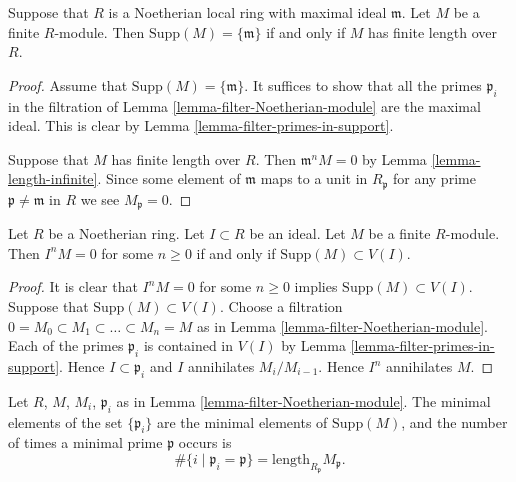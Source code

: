 \begin{lemma}
\label{lemma-support-point}
Suppose that $R$ is a Noetherian local ring with
maximal ideal $\mathfrak m$. Let $M$ be a finite
$R$-module. Then $\text{Supp}(M) = \{ \mathfrak m\}$
if and only if $M$ has finite length over $R$.
\end{lemma}

\begin{proof}
Assume that $\text{Supp}(M) = \{ \mathfrak m\}$.
It suffices to show that all the primes $\mathfrak p_i$
in the filtration of Lemma \ref{lemma-filter-Noetherian-module}
are the maximal ideal. This is clear by
Lemma \ref{lemma-filter-primes-in-support}.

\medskip\noindent
Suppose that $M$ has finite length over $R$.
Then $\mathfrak m^n M = 0$ by Lemma \ref{lemma-length-infinite}.
Since some element of $\mathfrak m$ maps to a unit
in $R_{\mathfrak p}$ for any prime
$\mathfrak p \not = \mathfrak m$ in $R$ we see $M_{\mathfrak p} = 0$.
\end{proof}

\begin{lemma}
\label{lemma-Noetherian-power-ideal-kills-module}
Let $R$ be a Noetherian ring.
Let $I \subset R$ be an ideal.
Let $M$ be a finite $R$-module.
Then $I^nM = 0$ for some $n \geq 0$ if and only if
$\text{Supp}(M) \subset V(I)$.
\end{lemma}

\begin{proof}
It is clear that $I^nM = 0$ for some $n \geq 0$ implies
$\text{Supp}(M) \subset V(I)$. Suppose that $\text{Supp}(M) \subset V(I)$.
Choose a filtration $0 = M_0 \subset M_1 \subset \ldots \subset M_n = M$
as in Lemma \ref{lemma-filter-Noetherian-module}. Each of the primes
$\mathfrak p_i$ is contained in $V(I)$ by
Lemma \ref{lemma-filter-primes-in-support}.
Hence $I \subset \mathfrak p_i$ and $I$ annihilates $M_i/M_{i - 1}$.
Hence $I^n$ annihilates $M$.
\end{proof}

\begin{lemma}
\label{lemma-filter-minimal-primes-in-support}
Let $R$, $M$, $M_i$, $\mathfrak p_i$ as in
Lemma \ref{lemma-filter-Noetherian-module}.
The minimal elements of the set $\{\mathfrak p_i\}$
are the minimal elements of $\text{Supp}(M)$, and
the number of times a minimal prime $\mathfrak p$
occurs is
$$
\#\{i \mid \mathfrak p_i = \mathfrak p\}
=
\text{length}_{R_\mathfrak p} M_{\mathfrak p}.
$$
\end{lemma}

